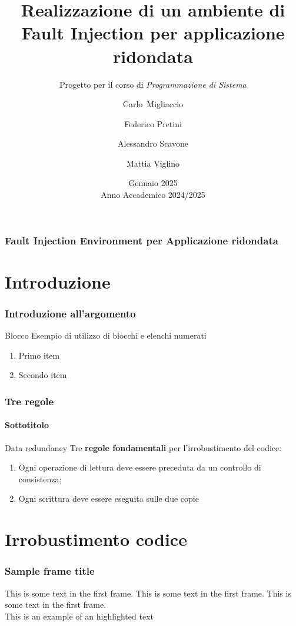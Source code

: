 \documentclass[aspectratio=169]{beamer}
\title[Fault Injection Environment per Applicazione ridondata]
{\Huge Realizzazione di un ambiente di Fault Injection
per applicazione ridondata
}
\subtitle{Progetto per il corso di \textit{Programmazione di Sistema}}
\author[C.Migliaccio, F.Pretini, A.Scavone, M.Viglino]
{Carlo~Migliaccio\and 
Federico Pretini\and  
Alessandro Scavone \and 
Mattia Viglino }
\institute[PoliTO]
{Corso di Laurea Magistrale in Ingegneria Informatica \\
Politecnico di Torino}
\date[Gennaio 2025 AA 2024/2025]{Gennaio 2025\\
Anno Accademico 2024/2025}
\begin{document}

\begin{frame}
    \frametitle{Fault Injection Environment per Applicazione ridondata}
    \tableofcontents
    \end{frame}

    \section{Introduzione}

    \begin{frame}
        \frametitle{Introduzione all'argomento}
        \begin{block}{Blocco}
            Esempio di utilizzo di blocchi e elenchi numerati
        \end{block}      
        \begin{enumerate}
            \item Primo item
            \item Secondo item
        \end{enumerate}
    \end{frame}

    \begin{frame}
        \frametitle{Tre regole}
        \framesubtitle{Sottotitolo}
        \begin{alertblock}{Data redundancy}
            Tre \textbf{regole fondamentali} per l'irrobustimento del codice: 
            \begin{enumerate}
                \item Ogni operazione di lettura deve essere preceduta da un controllo di consistenza;
                \item Ogni scrittura deve essere eseguita  sulle due copie
            \end{enumerate}
        \end{alertblock}
    \end{frame}

    \section{Irrobustimento codice}

    
    \begin{frame}
    \frametitle{Sample frame title}
    This is some text in the first frame. This is some text in the first frame. This is some text in the first frame.\\ \pause
    This is an example of an \alert{highlighted} text
    \end{frame}
\end{document}
